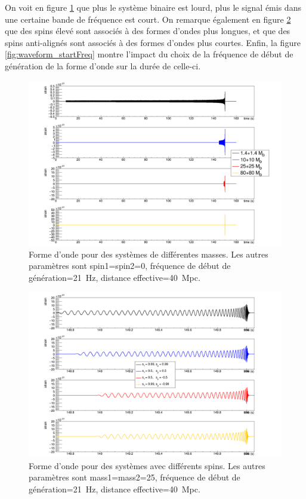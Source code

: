 On voit en figure \ref{fig:waveform_mass} que plus le système binaire est lourd, plus le signal émis dans une certaine bande de fréquence est court.
On remarque également en figure \ref{fig:waveform_spin} que des spins élevé sont associés à des formes d'ondes plus longues, et que des spins anti-alignés sont associés à des formes d'ondes plus courtes.
Enfin, la figure \ref{fig:waveform_startFreq} montre l'impact du choix de la fréquence de début de génération de la forme d'onde sur la durée de celle-ci.
%
\begin{figure}
  \includegraphics[width=\linewidth]{sectionGW/cWaveformMass.png}
  \caption{Forme d'onde pour des systèmes de différentes masses. Les autres paramètres sont spin1=spin2=0, fréquence de début de génération=\SI{21}{Hz}, distance effective=\SI{40}{Mpc}.}
  \label{fig:waveform_mass}
\end{figure}
% 
\begin{figure}
  \includegraphics[width=\linewidth]{sectionGW/cWaveformSpin.png}
  \caption{Forme d'onde pour des systèmes avec différents spins. Les autres paramètres sont mass1=mass2=\SI{25}{\msun}, fréquence de début de génération=\SI{21}{Hz}, distance effective=\SI{40}{Mpc}.}
  \label{fig:waveform_spin}
\end{figure}
